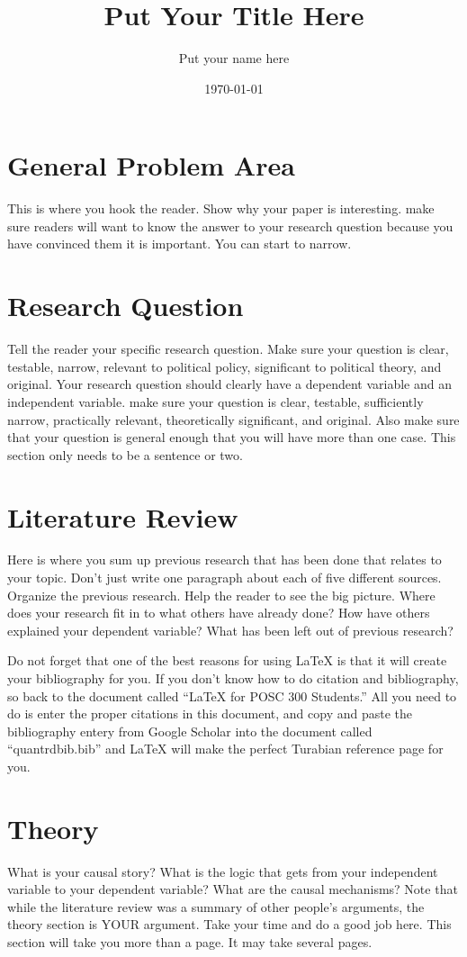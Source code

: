 \documentclass{turabian-researchpaper}
\title{Put Your Title Here}
\author{Put your name here}
\date{\today}
\begin{document}
\maketitle
\section{General Problem Area}
This is where you hook the reader. Show why your paper is interesting. make sure readers will want to know the answer to your research question because you have convinced them it is important. You can start to narrow. 

\section{Research Question}
Tell the reader your specific research question. Make sure your question is clear, testable, narrow, relevant to political policy, significant to political theory, and original. Your research question should clearly have a dependent variable and an independent variable. make sure your question is clear, testable, sufficiently narrow, practically relevant, theoretically significant, and original. Also make sure that your question is general enough that you will have more than one case. This section only needs to be a sentence or two.

\section{Literature Review}
Here is where you sum up previous research that has been done that relates to your topic. Don't just write one paragraph about each of five different sources. Organize the previous research. Help the reader to see the big picture. Where does your research fit in to what others have already done? How have others explained your dependent variable? What has been left out of previous research? 

Do not forget that one of the best reasons for using \LaTeX{} is that it will create your bibliography for you. If you don't know how to do citation and bibliography, so back to the document called ``\LaTeX{} for POSC 300 Students.'' All you need to do is enter the proper citations in this document, and copy and paste the bibliography entery from Google Scholar into the document called ``quantrdbib.bib'' and \LaTeX{} will make the perfect Turabian reference page for you.

\section{Theory}
What is your causal story? What is the logic that gets from your independent variable to your dependent variable? What are the causal mechanisms? Note that while the literature review was a summary of other people's arguments, the theory section is YOUR argument. Take your time and do a good job here. This section will take you more than a page. It may take several pages.
\end{document}
